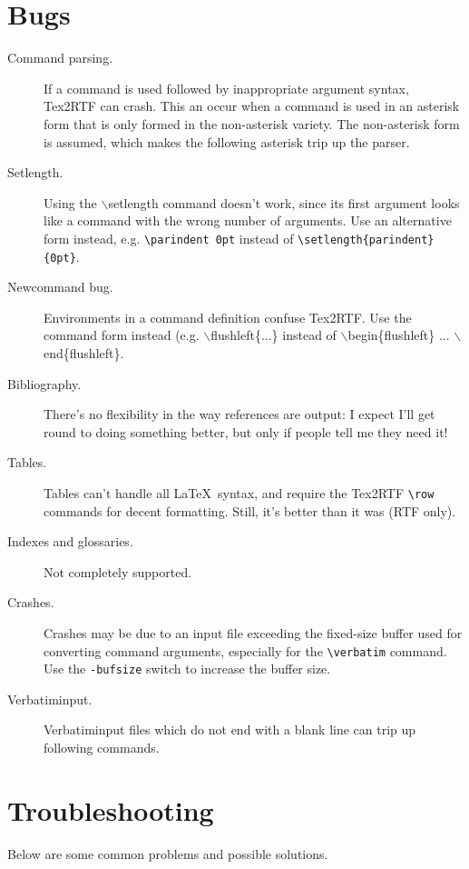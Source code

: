 \section{Bugs}

\begin{description}
\item[Command parsing.] If a command is used followed by inappropriate
argument syntax, Tex2RTF can crash. This an occur when a command is
used in an asterisk form that is only formed in the non-asterisk
variety. The non-asterisk form is assumed, which makes the following
asterisk trip up the parser.
\item[Setlength.] Using the $\backslash$setlength command doesn't work,
since its first argument looks like a command with the wrong number
of arguments. Use an alternative form instead, e.g. \verb$\parindent 0pt$ instead
of \verb$\setlength{parindent}{0pt}$.
\item[Newcommand bug.] Environments in a command definition confuse
Tex2RTF. Use the command form instead (e.g. $\backslash$flushleft\{...\} instead
of $\backslash$begin\{flushleft\} ... $\backslash$end\{flushleft\}.
\item[Bibliography.] There's no flexibility in the way references
are output: I expect I'll get round to doing something better,
but only if people tell me they need it!
\item[Tables.] Tables can't handle all \LaTeX\ syntax, and require
the Tex2RTF \verb$\row$ commands for decent formatting. Still, it's
better than it was (RTF only).
\item[Indexes and glossaries.] Not completely supported.
\item[Crashes.] Crashes may be due to an input file exceeding the fixed-size
buffer used for converting command arguments, especially for the \verb$\verbatim$\rtfsp
command. Use the {\tt -bufsize} switch to increase the buffer size.
\item[Verbatiminput.] Verbatiminput files which do not end with a blank line
can trip up following commands.
\end{description}

\section{Troubleshooting}

Below are some common problems and possible solutions.


